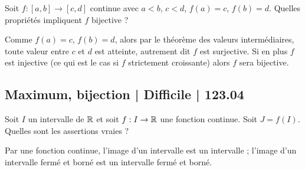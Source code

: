 \begin{question}
Soit $f : [a,b] \to [c,d]$ continue avec $a < b$, $c < d$, $f(a)=c$, $f(b)=d$. Quelles propriétés impliquent $f$ bijective ?
\begin{answers}



\end{answers}
\begin{explanations}
Comme $f(a)=c$, $f(b)=d$, alors par le théorème des valeurs intermédiaires, toute valeur entre $c$ et $d$ est atteinte, autrement dit $f$ est surjective. 
Si en plus $f$ est injective (ce qui est le cas si $f$ strictement croissante) alors $f$ sera bijective.
\end{explanations}
\end{question}




\subsection{Maximum, bijection | Difficile | 123.04}



\begin{question}
Soit $I$ un intervalle de $\mathbb{R}$ et soit $f : I \to \mathbb{R}$ une fonction continue. Soit $J=f(I)$. Quelles sont les assertions vraies ?
\begin{answers}



\end{answers}
\begin{explanations}
Par une fonction continue, l'image d'un intervalle est un intervalle ;
l'image d'un intervalle fermé et borné est un intervalle fermé et borné. 
\end{explanations}
\end{question}


